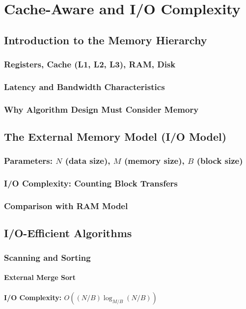 
\chapter{Cache-Aware and I/O Complexity}
\section{Introduction to the Memory Hierarchy}
\subsection{Registers, Cache (L1, L2, L3), RAM, Disk}
\subsection{Latency and Bandwidth Characteristics}
\subsection{Why Algorithm Design Must Consider Memory}

\section{The External Memory Model (I/O Model)}
\subsection{Parameters: $N$ (data size), $M$ (memory size), $B$ (block size)}
\subsection{I/O Complexity: Counting Block Transfers}
\subsection{Comparison with RAM Model}

\section{I/O-Efficient Algorithms}
\subsection{Scanning and Sorting}
\subsubsection{External Merge Sort}
\subsubsection{I/O Complexity: $O((N/B) \log_{M/B}(N/B))$}
